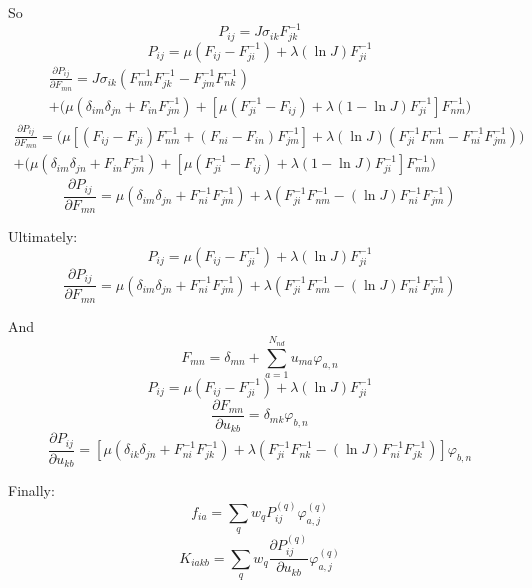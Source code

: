 \documentclass[12pt]{article}
\begin{document}
So
\begin{equation}
	P_{ij} = J \sigma_{ik} F_{jk}^{-1}
\end{equation}
\begin{equation}
	P_{ij} = \mu (F_{ij} - F_{ji}^{-1}) + \lambda ( \ln J ) F_{ji}^{-1}
\end{equation}
\begin{eqnarray}
	\frac{\partial P_{ij}}{\partial F_{mn}} = J \sigma_{ik} (F_{nm}^{-1} F_{jk}^{-1} - F_{jm}^{-1} F_{nk}^{-1}) \\ + \bigg( \mu ( \delta_{im} \delta_{jn} + F_{in} F_{jm}^{-1} ) + \left[ \mu (F_{ji}^{-1} - F_{ij}) + \lambda ( 1 - \ln J ) F_{ji}^{-1} \right] F_{nm}^{-1} \bigg)
\end{eqnarray}
\begin{eqnarray}
	\frac{\partial P_{ij}}{\partial F_{mn}} = \bigg( \mu \left[ (F_{ij} - F_{ji}) F_{nm}^{-1} + (F_{ni} - F_{in}) F_{jm}^{-1}\right] + \lambda ( \ln J ) (F_{ji}^{-1} F_{nm}^{-1} - F_{ni}^{-1} F_{jm}^{-1}) \bigg) \\ + \bigg( \mu ( \delta_{im} \delta_{jn} + F_{in} F_{jm}^{-1} ) + \left[ \mu (F_{ji}^{-1} - F_{ij}) + \lambda ( 1 - \ln J ) F_{ji}^{-1} \right] F_{nm}^{-1} \bigg)
\end{eqnarray}
\begin{equation}
	\frac{\partial P_{ij}}{\partial F_{mn}} = \mu (\delta_{im} \delta_{jn} + F_{ni}^{-1} F_{jm}^{-1}) + \lambda ( F_{ji}^{-1} F_{nm}^{-1} - ( \ln J ) F_{ni}^{-1} F_{jm}^{-1} )
\end{equation}

Ultimately:
\begin{equation}
	P_{ij} = \mu (F_{ij} - F_{ji}^{-1}) + \lambda ( \ln J ) F_{ji}^{-1}
\end{equation}
\begin{equation}
	\frac{\partial P_{ij}}{\partial F_{mn}} = \mu (\delta_{im} \delta_{jn} + F_{ni}^{-1} F_{jm}^{-1}) + \lambda ( F_{ji}^{-1} F_{nm}^{-1} - ( \ln J ) F_{ni}^{-1} F_{jm}^{-1} )
\end{equation}

And
\begin{equation}
	F_{mn} = \delta_{mn} + \sum_{a = 1}^{N_{nd}} u_{ma} \varphi_{a,n}
\end{equation}
\begin{equation}
	P_{ij} = \mu (F_{ij} - F_{ji}^{-1}) + \lambda ( \ln J ) F_{ji}^{-1}
\end{equation}
\begin{equation}
	\frac{\partial F_{mn}}{\partial u_{kb}} = \delta_{mk} \varphi_{b,n}
\end{equation}
\begin{equation}
	\frac{\partial P_{ij}}{\partial u_{kb}} = \left[ \mu (\delta_{ik} \delta_{jn} + F_{ni}^{-1} F_{jk}^{-1}) + \lambda ( F_{ji}^{-1} F_{nk}^{-1} - ( \ln J ) F_{ni}^{-1} F_{jk}^{-1} ) \right] \varphi_{b,n}
\end{equation}

Finally:
\begin{equation}
	f_{ia} = \sum_{q} w_q P^{(q)}_{ij} \varphi^{(q)}_{a,j}
\end{equation}
\begin{equation}
	K_{iakb} = \sum_{q} w_q \frac{\partial P^{(q)}_{ij}}{\partial u_{kb}} \varphi^{(q)}_{a,j}
\end{equation}
\end{document}
